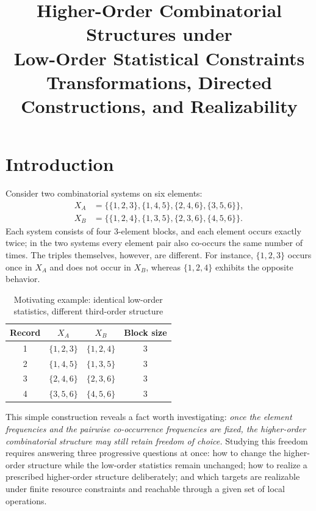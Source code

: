 \documentclass[11pt,a4paper]{article}
\title{\bfseries Higher-Order Combinatorial Structures under\\[0.15em]
Low-Order Statistical Constraints\\[0.7em]
\large Transformations, Directed Constructions, and Realizability}
\author{}
\date{}
\numberwithin{equation}{section}
\theoremstyle{definition}
\numberwithin{algorithm}{section}
\begin{document}
\maketitle
\vspace{-3.4em}

\section{Introduction}\label{sec:intro}

Consider two combinatorial systems on six elements:
\begin{equation}
\begin{aligned}
X_A&=\bigl\{\{1,2,3\},\{1,4,5\},\{2,4,6\},\{3,5,6\}\bigr\},\\
X_B&=\bigl\{\{1,2,4\},\{1,3,5\},\{2,3,6\},\{4,5,6\}\bigr\}.
\end{aligned}
\label{eq:intro-example}
\end{equation}
Each system consists of four $3$-element blocks, and each element occurs exactly twice;
in the two systems every element pair also co-occurs the same number of times.
The triples themselves, however, are different.
For instance, $\{1,2,3\}$ occurs once in $X_A$ and does not occur in $X_B$,
whereas $\{1,2,4\}$ exhibits the opposite behavior.

\begin{table}[htbp]
\centering
\caption{Motivating example: identical low-order statistics, different third-order structure}
\label{tab:intro-example}
\begin{tabular}{cccc}
\toprule
Record & $X_A$ & $X_B$ & Block size\\
\midrule
1 & $\{1,2,3\}$ & $\{1,2,4\}$ & 3\\
2 & $\{1,4,5\}$ & $\{1,3,5\}$ & 3\\
3 & $\{2,4,6\}$ & $\{2,3,6\}$ & 3\\
4 & $\{3,5,6\}$ & $\{4,5,6\}$ & 3\\
\bottomrule
\end{tabular}
\end{table}

This simple construction reveals a fact worth investigating:
\emph{once the element frequencies and the pairwise co-occurrence frequencies are fixed,
the higher-order combinatorial structure may still retain freedom of choice.}
Studying this freedom requires answering three progressive questions at once:
how to change the higher-order structure while the low-order statistics remain unchanged;
how to realize a prescribed higher-order structure deliberately;
and which targets are realizable under finite resource constraints and reachable
through a given set of local operations.
\end{document}
